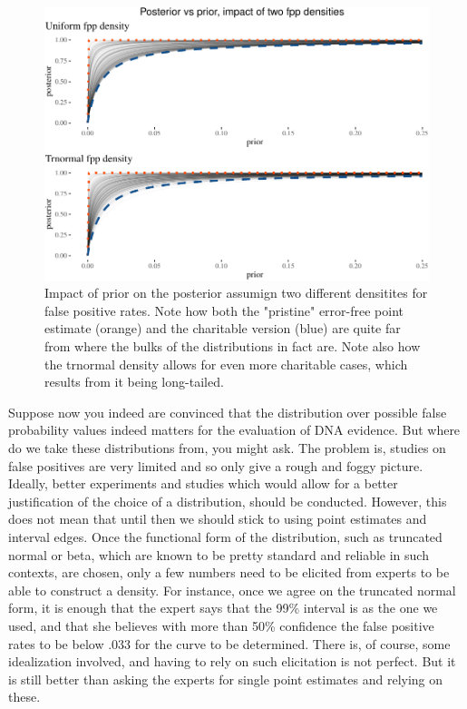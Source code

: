 \documentclass[
  10pt,
  dvipsnames,enabledeprecatedfontcommands]{scrartcl}
\begin{document}
\begin{figure}[H]

\begin{center}\includegraphics[width=0.8\linewidth]{chapter-outline_files/figure-latex/fig:fplinesPlot2-1} \end{center}
\caption{Impact of prior on the posterior assumign two different densitites for false positive rates. Note how both the "pristine" error-free point estimate (orange) and the charitable version (blue) are quite far from where the bulks of the distributions in fact are. Note also how the trnormal density allows for even more charitable cases, which results from it being long-tailed.}
\label{fig:fplinesPlot}
\end{figure}

Suppose now you indeed are convinced that the distribution over possible
false probability values indeed matters for the evaluation of DNA
evidence. But where do we take these distributions from, you might ask.
The problem is, studies on false positives are very limited and so only
give a rough and foggy picture. Ideally, better experiments and studies
which would allow for a better justification of the choice of a
distribution, should be conducted. However, this does not mean that
until then we should stick to using point estimates and interval edges.
Once the functional form of the distribution, such as truncated normal
or beta, which are known to be pretty standard and reliable in such
contexts, are chosen, only a few numbers need to be elicited from
experts to be able to construct a density. For instance, once we agree
on the truncated normal form, it is enough that the expert says that the
99\% interval is as the one we used, and that she believes with more
than 50\% confidence the false positive rates to be below \(.033\) for
the curve to be determined. There is, of course, some idealization
involved, and having to rely on such elicitation is not perfect. But it
is still better than asking the experts for single point estimates and
relying on these.
\end{document}
